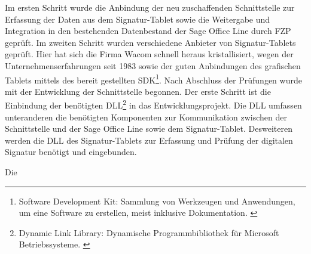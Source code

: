 Im ersten Schritt wurde die Anbindung der neu zuschaffenden Schnittstelle zur Erfassung der Daten aus dem Signatur-Tablet sowie die Weitergabe und Integration in den bestehenden Datenbestand der Sage Office Line durch FZP geprüft. Im zweiten Schritt wurden verschiedene Anbieter von Signatur-Tablets geprüft. Hier hat sich die Firma Wacom schnell heraus kristallisiert, wegen der Unternehmenserfahrungen seit 1983 \cite{konzept1} sowie der guten Anbindungen des grafischen Tablets mittels des bereit gestellten SDK\footnote{\label{foot:4} Software Development Kit: Sammlung von Werkzeugen und Anwendungen, um eine Software zu erstellen, meist inklusive Dokumentation. \cite{SDK}}. Nach Abschluss der Prüfungen wurde mit der Entwicklung der Schnittstelle begonnen. Der erste Schritt ist die Einbindung der benötigten DLL\footnote{\label{foot:5} Dynamic Link Library: Dynamische Programmbibliothek für Microsoft Betriebssysteme. \cite{DLL}} in das Entwicklungsprojekt. Die DLL umfassen unteranderen die benötigten Komponenten zur Kommunikation zwischen der Schnittstelle und der Sage Office Line sowie dem Signatur-Tablet. Desweiteren werden die DLL des Signatur-Tablets zur Erfassung und Prüfung der digitalen Signatur benötigt und eingebunden.

Die 